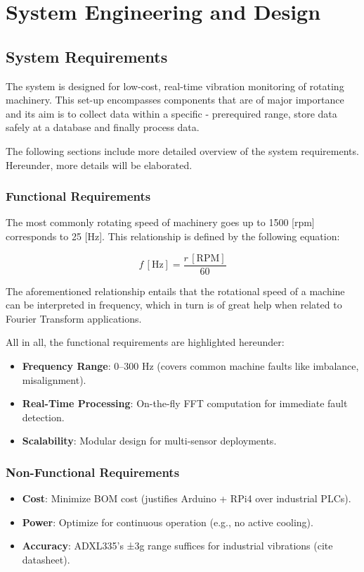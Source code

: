 \chapter{System Engineering and Design}  
\label{chap3}  

\section{System Requirements} 
{ 
The system is designed for low-cost, real-time vibration monitoring of rotating machinery. This set-up encompasses components that are of major importance and its aim is to collect data within a specific - prerequired range, store data safely at a database and finally process data.

The following sections include more detailed overview of the system requirements. Hereunder, more details will be elaborated.
}

\subsection{Functional Requirements} 
{ 
The most commonly rotating speed of machinery goes up to 1500 [rpm] corresponds to 25 [Hz]. This relationship is defined by the following equation: 

\begin{equation}
	f \, [\mathrm{Hz}] = \frac{r \, [\mathrm{RPM}]}{60}
\end{equation}

The aforementioned relationship entails that the rotational speed of a machine can be interpreted in frequency, which in turn is of great help when related to Fourier Transform applications.

All in all, the functional requirements are highlighted hereunder:
\begin{itemize}  
	\item \textbf{Frequency Range}: 0–300 Hz (covers common machine faults like imbalance, misalignment).  
	\item \textbf{Real-Time Processing}: On-the-fly FFT computation for immediate fault detection.  
	\item \textbf{Scalability}: Modular design for multi-sensor deployments.  
\end{itemize}  
}

\subsection{Non-Functional Requirements} 
{ 
\begin{itemize}  
	\item \textbf{Cost}: Minimize BOM cost (justifies Arduino + RPi4 over industrial PLCs).  
	\item \textbf{Power}: Optimize for continuous operation (e.g., no active cooling).  
	\item \textbf{Accuracy}: ADXL335’s ±3g range suffices for industrial vibrations (cite datasheet).  
\end{itemize}  
}

